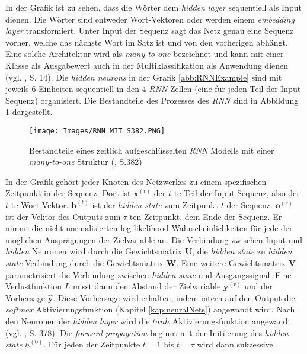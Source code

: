 \documentclass[a4paper,11pt]{article}
\begin{document}
In der Grafik ist zu sehen, dass die Wörter dem \textit{hidden layer} sequentiell als Input dienen. Die Wörter sind entweder Wort-Vektoren oder werden einem \textit{embedding layer} transformiert. Unter Input der Sequenz  sagt das Netz genau eine Sequenz vorher, welche das nächste Wort im Satz ist und von den vorherigen abhängt. 
Eine solche Architektur wird als \textit{many-to-one}
bezeichnet und kann mit einer Klasse als Ausgabewert auch in der Multiklassifikation als Anwendung dienen (vgl. \cite{deepEssentials}, S. 14). Die \textit{hidden neurons} in der Grafik \ref{abb:RNNExample} sind mit jeweils $6$ Einheiten sequentiell in den $4$ \textit{RNN} Zellen (eine für jeden Teil der Input Sequenz) organisiert. Die Bestandteile des Prozesses des \textit{RNN} sind in Abbildung \ref{abb:RNNArch} dargestellt.

\begin{figure}[!ht]
\begin{center}
\texttt{[image: Images/RNN\_MIT\_S382.PNG]}
\caption{Bestandteile eines zeitlich aufgeschlüsselten \textit{RNN} Modells mit einer \textit{many-to-one} Struktur (\cite{deepL}, S.382)}
\label{abb:RNNArch}
\end{center}
\end{figure}

In der Grafik gehört jeder Knoten des Netzwerkes zu einem spezifischen Zeitpunkt in der Sequenz.
Dort ist $\bm{x}^{(t)}$ der $t$-te Teil der Input Sequenz, also der $t$-te Wort-Vektor. $\bm{h}^{(t)}$ ist der \textit{hidden state} zum Zeitpunkt $t$ der Sequenz. $\bm{o}^{(r)}$ ist der Vektor des Outputs zum $\tau$-ten Zeitpunkt, dem Ende der Sequenz. Er nimmt die nicht-normalisierten log-likelihood Wahrscheinlichkeiten für jede der möglichen Ausprägungen der Zielvariable an.
Die Verbindung zwischen Input und \textit{hidden} Neuronen wird durch die Gewichtsmatrix $\bm{U}$, die \textit{hidden state} zu \textit{hidden state} Verbindung durch die Gewichtsmatrix $\bm{W}$. Eine weitere Gewichtsmatrix $\bm{V}$ parametrisiert die Verbindung zwischen \textit{hidden state} und Ausgangssignal. Eine Verlustfunktion $L$ misst dann den Abstand der Zielvariable $\bm{y}^{(r)}$ und der Vorhersage $\bm{\hat{y}}$. Diese Vorhersage wird erhalten, indem intern auf den Output die \textit{softmax} Aktivierungsfunktion (Kapitel \ref{kap:neuralNets}) angewandt wird. Nach den Neuronen der \textit{hidden layer} wird die $tanh$ Aktivierungsfunktion angewandt (vgl. \cite{deepL}, S. 378). Die \textit{forward propagation} beginnt mit der Initiierung des \textit{hidden state} $h^{(0)}$. Für jeden der Zeitpunkte $t=1$ bis $t = \tau$ wird dann sukzessive 
\end{document}
